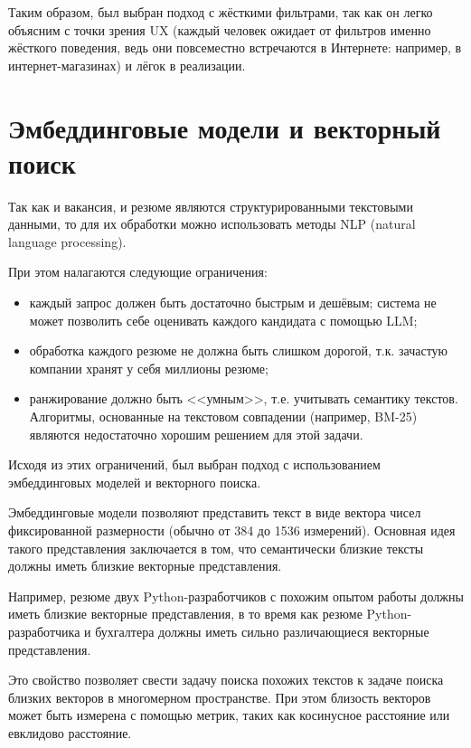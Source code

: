 \documentclass[14pt]{mmcs_article}
\begin{document}
Таким образом, был выбран подход с жёсткими фильтрами, так как он легко объясним с точки зрения UX (каждый человек ожидает от фильтров именно жёсткого поведения, ведь они повсеместно встречаются в Интернете: например, в интернет-магазинах) и лёгок в реализации.


\newpage
\section{Эмбеддинговые модели и векторный поиск}\label{embedding_models}

Так как и вакансия, и резюме являются структурированными текстовыми данными, то для их обработки можно использовать методы NLP (natural language processing).

При этом налагаются следующие ограничения:

\begin{itemize}
  \item каждый запрос должен быть достаточно быстрым и дешёвым; система не может позволить себе оценивать каждого кандидата с помощью LLM;
  \item обработка каждого резюме не должна быть слишком дорогой, т.к. зачастую компании хранят у себя миллионы резюме;
  \item ранжирование должно быть <<умным>>, т.е. учитывать семантику текстов. Алгоритмы, основанные на текстовом совпадении (например, BM-25) являются недостаточно хорошим решением для этой задачи.
\end{itemize}

Исходя из этих ограничений, был выбран подход с использованием эмбеддинговых моделей и векторного поиска.

Эмбеддинговые модели позволяют представить текст в виде вектора чисел фиксированной размерности (обычно от 384 до 1536 измерений). Основная идея такого представления заключается в том, что семантически близкие тексты должны иметь близкие векторные представления.

Например, резюме двух Python-разработчиков с похожим опытом работы должны иметь близкие векторные представления, в то время как резюме Python-разработчика и бухгалтера должны иметь сильно различающиеся векторные представления.

Это свойство позволяет свести задачу поиска похожих текстов к задаче поиска близких векторов в многомерном пространстве. При этом близость векторов может быть измерена с помощью метрик, таких как косинусное расстояние или евклидово расстояние.
\end{document}
